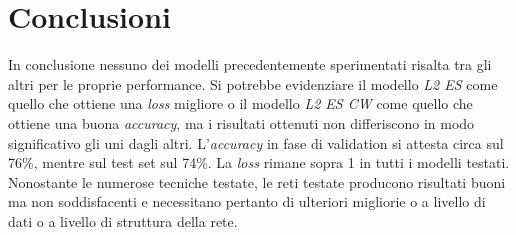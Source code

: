 \section{Conclusioni}

In conclusione nessuno dei modelli precedentemente sperimentati risalta tra gli altri per le proprie performance. Si potrebbe evidenziare il modello \textit{L2 ES} come quello che ottiene una \textit{loss} migliore o il modello \textit{L2 ES CW} come quello che ottiene una buona \textit{accuracy}, ma i risultati ottenuti non differiscono in modo significativo gli uni dagli altri.
L'\textit{accuracy} in fase di validation si attesta circa sul 76\%, mentre sul test set sul 74\%. La \textit{loss} rimane sopra 1 in tutti i modelli testati.
Nonostante le numerose tecniche testate, le reti testate producono risultati buoni ma non soddisfacenti e necessitano pertanto di ulteriori migliorie o a livello di dati o a livello di struttura della rete. 
